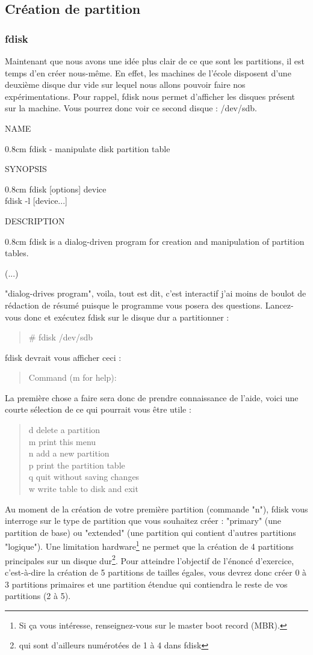 \documentclass[a4paper]{article}
\newcommand{\commande}[1] {
    \begin{quote}
    \tt\raggedright #1 
    \end{quote}
}
\newcommand{\man}[2]{
    \begin{tcolorbox}[toprule=3mm,width=\textwidth,outer arc=0mm,colbacktitle=grayman,coltitle=black,colback={grayman},colframe={grayman},title={man : \tt #1}]
        \tt\raggedright #2
    \end{tcolorbox}
}
\newcommand{\mandesc}[1]{
    \begin{adjustwidth}{0.8cm}{}
        #1
    \end{adjustwidth}
}
\begin{document}
\subsection{Création de partition}
\subsubsection{fdisk}
\par Maintenant que nous avons une idée plus clair de ce que sont les partitions, il est temps d'en créer nous-même. En effet, les machines de l'école disposent d'une deuxième disque dur vide sur lequel nous allons pouvoir faire nos expérimentations. Pour rappel, fdisk nous permet d'afficher les disques présent sur la machine. Vous pourrez donc voir ce second disque : /dev/sdb.
\man{fdisk}{NAME
\mandesc{fdisk - manipulate disk partition table}
SYNOPSIS
\mandesc{fdisk [options] device\\
fdisk -l [device...]}
DESCRIPTION
\mandesc{fdisk is a dialog-driven program for creation and manipulation of partition tables.}
(...)
}
\par "dialog-drives program", voila, tout est dit, c'est interactif j'ai moins de boulot de rédaction de résumé puisque le programme vous posera des questions. Lancez-vous donc et exécutez fdisk sur le disque dur a partitionner :
\commande{\# fdisk /dev/sdb}
\par fdisk devrait vous afficher ceci :
\commande{Command (m for help):}
\par La première chose a faire sera donc de prendre connaissance de l'aide, voici une courte sélection de ce qui pourrait vous être utile :
\commande{d delete a partition\\
m print this menu\\
n add a new partition\\
p print the partition table\\
q quit without saving changes\\
w write table to disk and exit}
\par Au moment de la création de votre première partition (commande "n"), fdisk vous interroge sur le type de partition que vous souhaitez créer : "primary" (une partition de base) ou "extended" (une partition qui contient d'autres partitions "logique"). Une limitation hardware\footnote{Si ça vous intéresse, renseignez-vous sur le master boot record (MBR).} ne permet que la création de 4 partitions principales sur un disque dur\footnote{qui sont d'ailleurs numérotées de 1 à 4 dans fdisk}. Pour atteindre l'objectif de l'énoncé d'exercice, c'est-à-dire la création de 5 partitions de tailles égales, vous devrez donc créer 0 à 3 partitions primaires et une partition étendue qui contiendra le reste de vos partitions (2 à 5).
\end{document}
